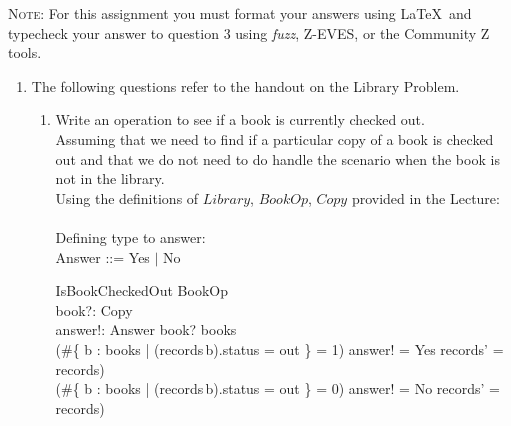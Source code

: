 \documentclass{article}
\begin{document}


\noindent \textsc{Note}: For this assignment you must format your
answers using \LaTeX\ and typecheck your answer to question 3 using {\em fuzz},  Z-EVES, or the Community Z tools.

\begin{enumerate}

\item The following questions refer to the handout on the Library Problem.
\begin{enumerate}
\item Write an operation to see if a book is currently checked out. \\
  \color{blue}
  Assuming that we need to find if a particular copy of a book is checked out and that
  we do not need to do handle the scenario when the book is not in the library.\\
  Using the definitions of $Library$, $BookOp$, $Copy$  provided in the Lecture: \\
  \\
  Defining type to answer: \\
  Answer ::= Yes $\mid$ No 
 \begin{schema}{IsBookCheckedOut}
   \Xi BookOp \\
   book?: Copy \\
   answer!: Answer
   \where
    book? \in books \\
    (\#\{ b : books | (records\,b).status = out \} = 1) \implies answer! = Yes \land
    records' = records) \land \\
    (\#\{ b : books | (records\,b).status = out \} = 0) \implies answer! = No \land
    records' = records) 
   
\end{schema}
\color{black}
 

\end{enumerate}
\end{enumerate}
\end{document}

